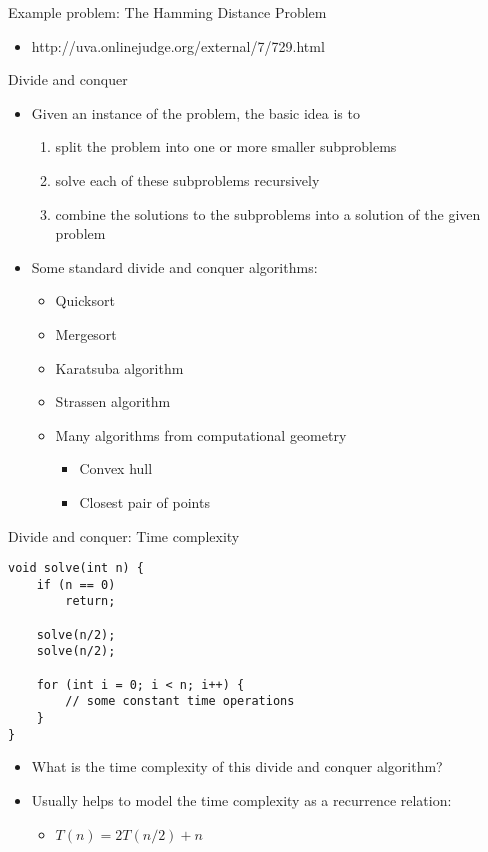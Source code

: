 \documentclass[12pt,t]{beamer}
\newcommand{\bi}{\begin{itemize}}
\newcommand{\ei}{\end{itemize}}
\begin{document}
\begin{frame}{Example problem: The Hamming Distance Problem}
    \bi
        \item http://uva.onlinejudge.org/external/7/729.html
    \ei
\end{frame}

\begin{frame}{Divide and conquer}
    \vspace{10pt}
    \bi
        \item Given an instance of the problem, the basic idea is to
            \begin{enumerate}
                \item split the problem into one or more smaller subproblems
                \item solve each of these subproblems recursively
                \item combine the solutions to the subproblems into a solution of the given problem
            \end{enumerate}

        \vspace{10pt}

        \item Some standard divide and conquer algorithms:
            \bi
                \item Quicksort
                \item Mergesort
                \item Karatsuba algorithm
                \item Strassen algorithm
                \item Many algorithms from computational geometry
                    \bi
                        \item Convex hull
                        \item Closest pair of points
                    \ei
            \ei
    \ei
\end{frame}

\begin{frame}[fragile]{Divide and conquer: Time complexity}
    \begin{verbatim}
void solve(int n) {
    if (n == 0)
        return;

    solve(n/2);
    solve(n/2);

    for (int i = 0; i < n; i++) {
        // some constant time operations
    }
}
    \end{verbatim}

    \bi
        \item What is the time complexity of this divide and conquer algorithm?
        \item Usually helps to model the time complexity as a recurrence relation:
            \bi
                \item $T(n) = 2T(n/2) + n$
            \ei
    \ei
\end{frame}
\end{document}
